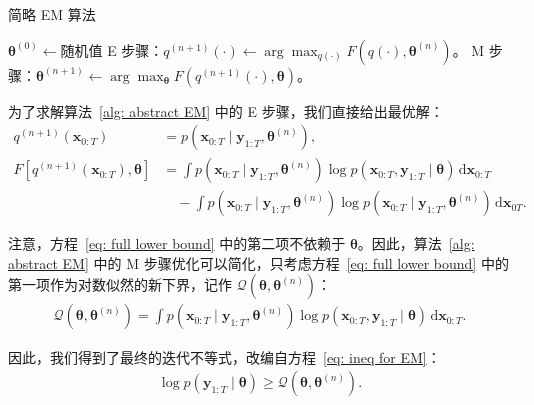 \begin{algorithm}[tb]
    \caption{简略 EM 算法}
    \label{alg: abstract EM}
    \begin{algorithmic}[1]
        \STATE \(\boldsymbol{\theta}^{(0)} \gets \text{随机值}\)
            \STATE E 步骤：\(q^{(n+1)}(\cdot) \gets \arg \max_{q(\cdot)} F(q(\cdot), \boldsymbol{\theta}^{(n)})\)。
            \STATE M 步骤：\(\boldsymbol{\theta}^{(n+1)} \gets \arg \max_{\boldsymbol{\theta}} F(q^{(n+1)}(\cdot), \boldsymbol{\theta})\)。
        \ENDFOR
    \end{algorithmic}
\end{algorithm}

为了求解算法~\ref{alg: abstract EM} 中的 E 步骤，我们直接给出最优解：
\begin{align}
    q^{(n+1)}(\mathbf{x}_{0:T}) &= p(\mathbf{x}_{0:T} \mid \mathbf{y}_{1:T}, \boldsymbol{\theta}^{(n)}), \\
    F[q^{(n+1)}(\mathbf{x}_{0:T}), \boldsymbol{\theta}] &= \int p(\mathbf{x}_{0:T} \mid \mathbf{y}_{1:T}, \boldsymbol{\theta}^{(n)}) \log p(\mathbf{x}_{0:T}, \mathbf{y}_{1:T} \mid \boldsymbol{\theta}) \, \mathrm{d} \mathbf{x}_{0:T} \label{eq: full lower bound} \\
    &\quad - \int p(\mathbf{x}_{0:T} \mid \mathbf{y}_{1:T}, \boldsymbol{\theta}^{(n)}) \log p(\mathbf{x}_{0:T} \mid \mathbf{y}_{1:T}, \boldsymbol{\theta}^{(n)}) \, \mathrm{d} \mathbf{x}_{0{T}}. \nonumber
\end{align}

注意，方程~\eqref{eq: full lower bound} 中的第二项不依赖于 \(\boldsymbol{\theta}\)。因此，算法~\ref{alg: abstract EM} 中的 M 步骤优化可以简化，只考虑方程~\eqref{eq: full lower bound} 中的第一项作为对数似然的新下界，记作 \(\mathcal{Q}(\boldsymbol{\theta}, \boldsymbol{\theta}^{(n)})\)：
\begin{align}
    \mathcal{Q}(\boldsymbol{\theta}, \boldsymbol{\theta}^{(n)}) = \int p(\mathbf{x}_{0:T} \mid \mathbf{y}_{1:T}, \boldsymbol{\theta}^{(n)}) \log p(\mathbf{x}_{0:T}, \mathbf{y}_{1:T} \mid \boldsymbol{\theta}) \, \mathrm{d} \mathbf{x}_{0:T}.
\end{align}

因此，我们得到了最终的迭代不等式，改编自方程~\eqref{eq: ineq for EM}：
\begin{align}
    \log p(\mathbf{y}_{1:T} \mid \boldsymbol{\theta}) \ge \mathcal{Q}(\boldsymbol{\theta}, \boldsymbol{\theta}^{(n)}). \label{eq: ineq for EM final}
\end{align}


